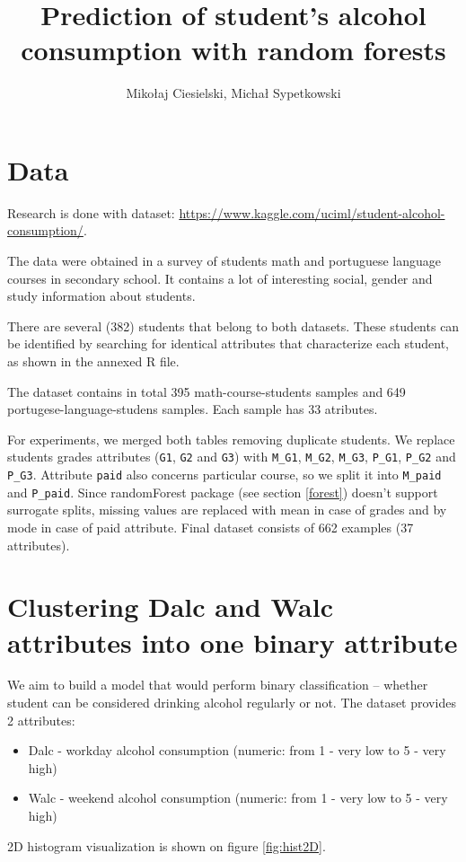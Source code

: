 \documentclass[a4paper]{article}
\begin{document}
\title{Prediction of student's alcohol consumption with random forests}

\author{Mikołaj Ciesielski, Michał Sypetkowski}
\setlength\columnsep{0.375in}  \newlength\titlebox \setlength\titlebox{2.25in}
\twocolumn
\maketitle



\section{Data}

Research is done with dataset: \url{https://www.kaggle.com/uciml/student-alcohol-consumption/}.

The data were obtained in a survey of students
math and portuguese language courses in secondary school.
It contains a lot of interesting social,
gender and study information about students.

There are several (382) students that belong to both datasets.
These students can be identified by searching for identical attributes
that characterize each student, as shown in the annexed R file.

The dataset contains in total 395 math-course-students samples and 
649 portugese-language-studens samples. Each sample has 33 atributes.

For experiments, we merged both tables removing duplicate students.
We replace students grades attributes
(\texttt{G1}, \texttt{G2} and \texttt{G3})
with
\texttt{M\_G1},
\texttt{M\_G2},
\texttt{M\_G3},
\texttt{P\_G1},
\texttt{P\_G2} and
\texttt{P\_G3}.
Attribute \texttt{paid} also concerns particular course, so we split it into
\texttt{M\_paid} and \texttt{P\_paid}.
Since randomForest package (see section \ref{forest}) doesn't support surrogate splits,
missing values are replaced with mean in case of grades and by mode in case of paid attribute.
Final dataset consists of 662 examples (37 attributes).

\section{Clustering Dalc and Walc attributes into one binary attribute}
\label{clust}

We aim to build a model that would perform binary classification --
whether student can be considered drinking alcohol regularly or not.
The dataset provides 2 attributes:
\begin{itemize}
    \item Dalc - workday alcohol consumption (numeric: from 1 - very low to 5 - very high)
    \item Walc - weekend alcohol consumption (numeric: from 1 - very low to 5 - very high)
\end{itemize}
2D histogram visualization is shown on figure \ref{fig:hist2D}.
\end{document}
